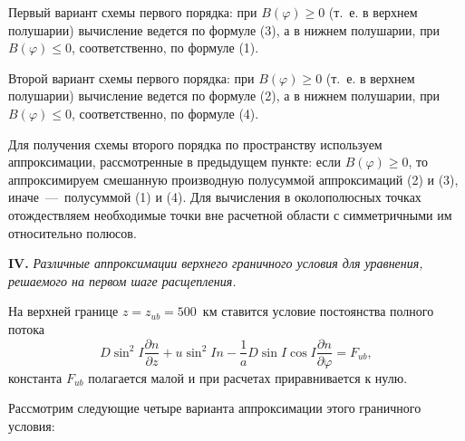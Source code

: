 \documentclass[2pt, a4paper, fleqn]{extarticle}
\let\leq\leqslant
\let\geq\geqslant
\begin{document}
Первый вариант схемы первого порядка: при $B(\varphi) \geq 0$ (т.~е. в верхнем полушарии) вычисление ведется по формуле (3), а в нижнем полушарии, при $B(\varphi) \leq 0$, соответственно, по формуле (1).

Второй вариант схемы первого порядка: при $B(\varphi) \geq 0$ (т.~е. в верхнем полушарии) вычисление ведется по формуле (2), а в нижнем полушарии, при $B(\varphi) \leq 0$, соответственно, по формуле (4).

Для получения схемы второго порядка по пространству используем аппроксимации, рассмотренные в предыдущем пункте: если $B(\varphi) \geq 0$, то аппроксимируем смешанную производную полусуммой аппроксимаций (2) и (3), иначе~---~полусуммой (1) и (4). Для вычисления в околополюсных точках отождествляем необходимые точки вне расчетной области с симметричными им относительно полюсов. 

\bigskip

{\bf IV.} \textit{Различные аппроксимации верхнего граничного условия для уравнения, решаемого на первом шаге расщепления.}

На верхней границе $z = z_{ub} = 500$~км ставится условие постоянства полного потока $$D\sin^2 I\dfrac{\partial n}{\partial z} + u\sin^2 I n - \dfrac{1}{a}D\sin I \cos I \dfrac{\partial n}{\partial \varphi} = F_{ub},$$ константа $F_{ub}$ полагается малой и при расчетах приравнивается к нулю.

Рассмотрим следующие четыре варианта аппроксимации этого граничного условия:
\end{document}
